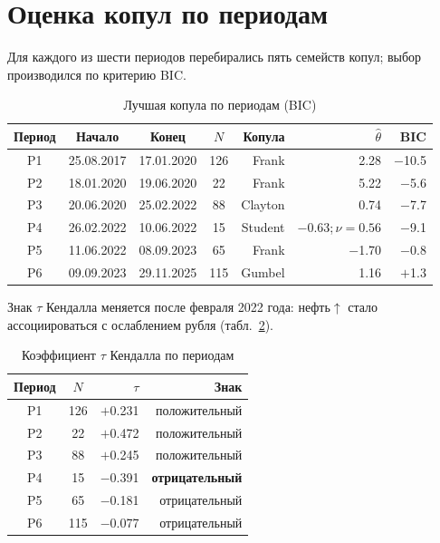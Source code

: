 \section{Оценка копул по периодам}

Для каждого из шести периодов перебирались пять семейств копул;
выбор производился по критерию BIC.

\begin{table}[h]
\centering
\caption{Лучшая копула по периодам (BIC)}
\label{tab:best}
\begin{tabular}{ccccrrr}
\toprule
Период & Начало & Конец & $N$ & Копула & $\hat\theta$ & BIC \\
\midrule
P1 & 25.08.2017 & 17.01.2020 & 126 & Frank   &  2.28 & $-$10.5 \\
P2 & 18.01.2020 & 19.06.2020 &  22 & Frank   &  5.22 & $-$5.6 \\
P3 & 20.06.2020 & 25.02.2022 &  88 & Clayton &  0.74 & $-$7.7 \\
P4 & 26.02.2022 & 10.06.2022 &  15 & Student & $-$0.63;\,$\nu=0.56$ & $-$9.1 \\
P5 & 11.06.2022 & 08.09.2023 &  65 & Frank   & $-$1.70 & $-$0.8 \\
P6 & 09.09.2023 & 29.11.2025 & 115 & Gumbel  &  1.16 & $+$1.3 \\
\bottomrule
\end{tabular}
\end{table}

Знак $\tau$ Кендалла меняется после февраля 2022 года:
нефть$\uparrow$ стало ассоциироваться с ослаблением рубля
(табл.~\ref{tab:tau}).

\begin{table}[h]
\centering
\caption{Коэффициент $\tau$ Кендалла по периодам}
\label{tab:tau}
\begin{tabular}{ccrr}
\toprule
Период & $N$ & $\tau$ & Знак \\
\midrule
P1 & 126 & $+$0.231 & положительный \\
P2 &  22 & $+$0.472 & положительный \\
P3 &  88 & $+$0.245 & положительный \\
P4 &  15 & $-$0.391 & \textbf{отрицательный} \\
P5 &  65 & $-$0.181 & отрицательный \\
P6 & 115 & $-$0.077 & отрицательный \\
\bottomrule
\end{tabular}
\end{table}


